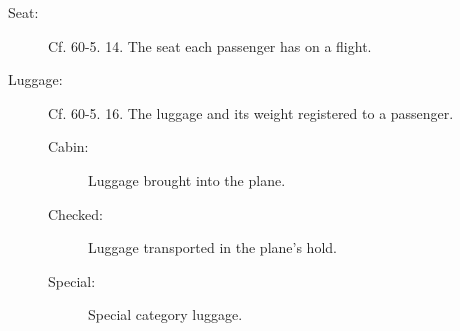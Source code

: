\begin{description}
\begin{description}
        \item[Seat:] Cf. 60-5. 14. The seat each passenger has on a flight. 
        \item[Luggage:] Cf. 60-5. 16. The luggage and its weight registered to a passenger.
        \begin{description}
            \item[Cabin:] Luggage brought into the plane.
            \item[Checked:] Luggage transported in the plane's hold.
            \item[Special:] Special category luggage.
        \end{description}
    \end{description}
\end{description}
